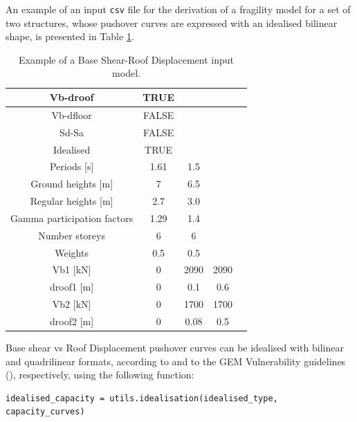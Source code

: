 An example of an input \verb=csv= file for the derivation of a fragility model for a set of two structures, whose pushover curves are expressed with an idealised bilinear shape, is presented in Table \ref{table:Vb-droof_input}.

\begin {table}[htb]
\caption{Example of a Base Shear-Roof Displacement input model.}
\label{table:Vb-droof_input}
\begin{center}
  \begin{tabular}{ | c | c | c | c | c |}
  \hline
    Vb-droof & TRUE &  &  \\ \hline
    Vb-dfloor & FALSE & & \\ \hline
    Sd-Sa & FALSE & & \\ \hline
    Idealised & TRUE & & \\ \hline
    Periods [s] & 1.61 & 1.5 & \\ \hline
    Ground heights [m] & 7 & 6.5 & \\ \hline
    Regular heights [m] & 2.7 & 3.0 & \\ \hline
    Gamma participation factors & 1.29 & 1.4 & \\ \hline
    Number storeys & 6 & 6 & \\ \hline
    Weights & 0.5 & 0.5 & \\ \hline
    Vb1 [kN] & 0 & 2090 & 2090 \\ \hline
    droof1 [m] & 0 & 0.1 & 0.6 \\ \hline
    Vb2 [kN] & 0 & 1700 & 1700 \\ \hline
    droof2 [m] & 0 & 0.08 & 0.5 \\ \hline
  \end{tabular}
\end{center}
\end{table}

Base shear vs Roof Displacement pushover curves can be idealised with bilinear and quadrilinear formats, according to \citep{FEMA4402005} and to the GEM Vulnerability guidelines (\citep{Dayala2014}), respectively, using the following function:

\begin{Verbatim}[frame=single, commandchars=\\\{\}, samepage=true]
idealised_capacity = utils.idealisation(idealised_type, capacity_curves)
\end{Verbatim}

